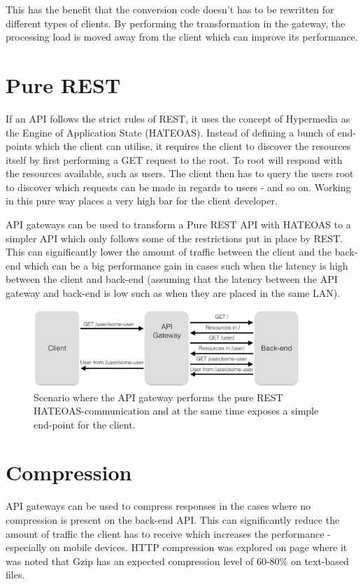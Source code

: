 \documentclass{cslthse-msc}
\begin{document}
This has the benefit that the conversion code doesn't has to be rewritten for different types of clients. By performing the transformation in the gateway, the processing load is moved away from the client which can improve its performance.

\section{Pure REST}
If an API follows the strict rules of REST, it uses the concept of Hypermedia as the Engine of Application State (HATEOAS). Instead of defining a bunch of end-points which the client can utilise, it requires the client to discover the resources itself by first performing a GET request to the root. To root will respond with the resources available, such as users. The client then has to query the users root to discover which requests can be made in regards to users - and so on. Working in this pure way places a very high bar for the client developer\cite[page 61]{AASG}.

API gateways can be used to transform a Pure REST API with HATEOAS to a simpler API which only follows some of the restrictions put in place by REST. This can significantly lower the amount of traffic between the client and the back-end which can be a big performance gain in cases such when the latency is high between the client and back-end (assuming that the latency between the API gateway and back-end is low such as when they are placed in the same LAN).

\begin{figure}[H]
  \centering
    \begin{center}
      \includegraphics[width=0.9\textwidth]{images/api_gateway_hateoas.png}
    \end{center}
  \caption{Scenario where the API gateway performs the pure REST HATEOAS-communication and at the same time exposes a simple end-point for the client.}
\end{figure}

\section{Compression}
API gateways can be used to compress responses in the cases where no compression is present on the back-end API. This can significantly reduce the amount of traffic the client has to receive which increases the performance - especially on mobile devices. HTTP compression was explored on page \pageref{compression} where it was noted that Gzip has an expected compression level of 60-80\% on text-based files.
\end{document}
